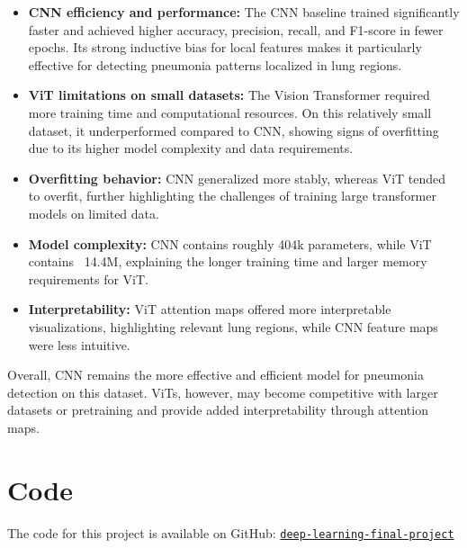 \documentclass{article}
\begin{document}
\begin{itemize}
    \item \textbf{CNN efficiency and performance:} The CNN baseline trained significantly faster and achieved higher accuracy, precision, recall, and F1-score in fewer epochs. Its strong inductive bias for local features makes it particularly effective for detecting pneumonia patterns localized in lung regions.
    \item \textbf{ViT limitations on small datasets:} The Vision Transformer required more training time and computational resources. On this relatively small dataset, it underperformed compared to CNN, showing signs of overfitting due to its higher model complexity and data requirements.
    \item \textbf{Overfitting behavior:} CNN generalized more stably, whereas ViT tended to overfit, further highlighting the challenges of training large transformer models on limited data.
    \item \textbf{Model complexity:} CNN contains roughly 404k parameters, while ViT contains ~14.4M, explaining the longer training time and larger memory requirements for ViT.
    \item \textbf{Interpretability:} ViT attention maps offered more interpretable visualizations, highlighting relevant lung regions, while CNN feature maps were less intuitive.
\end{itemize}

Overall, CNN remains the more effective and efficient model for pneumonia detection on this dataset. ViTs, however, may become competitive with larger datasets or pretraining and provide added interpretability through attention maps.

\section{Code}
The code for this project is available on GitHub: \href{https://github.com/Avital-Fine/deep-learning-final-project}{\texttt{deep-learning-final-project}}



\end{document}
